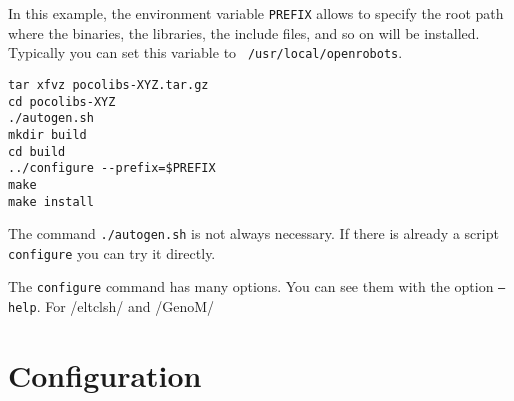 In this example, the environment variable {\tt PREFIX} allows to specify
the root path where the binaries, the libraries, the include files, and
so on will be installed. Typically you can set this variable to {\tt
/usr/local/openrobots}.

\begin{cartouche}
\begin{verbatim}
tar xfvz pocolibs-XYZ.tar.gz
cd pocolibs-XYZ
./autogen.sh
mkdir build
cd build
../configure --prefix=$PREFIX
make
make install
\end{verbatim}
\end{cartouche}

The command {\tt ./autogen.sh} is not always necessary. If there is
already a script {\tt configure} you can try it directly.

The {\tt configure} command has many options. You can see them with the
option {\tt --help}. For /eltclsh/ and /GenoM/

\section{Configuration}
\label{sec|configuration|configuration}


